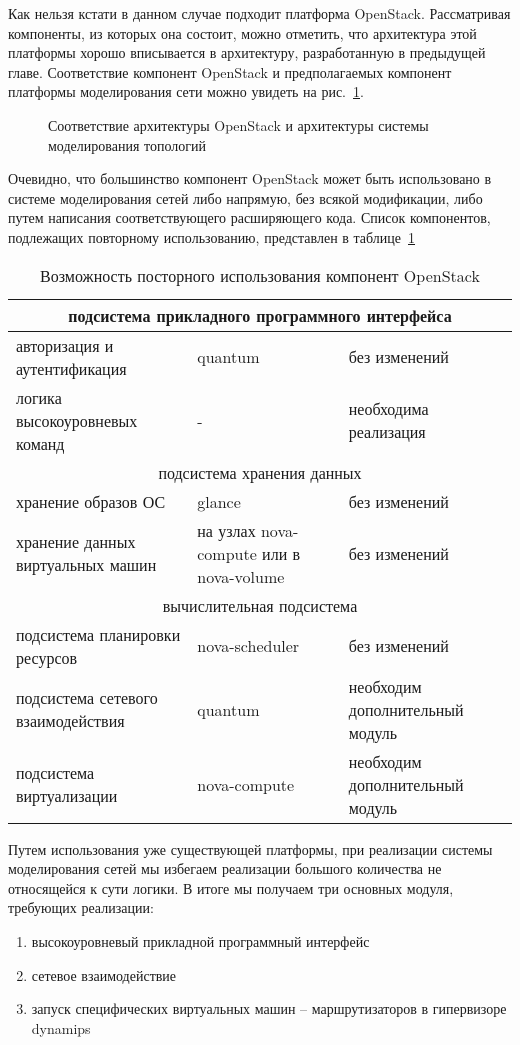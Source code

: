 Как нельзя кстати в данном случае подходит платформа OpenStack. Рассматривая компоненты,
из которых она состоит, можно отметить, что архитектура этой платформы хорошо вписывается
в архитектуру, разработанную в предыдущей главе. Соответствие компонент OpenStack и 
предполагаемых компонент платформы моделирования сети можно увидеть на рис.~\ref{fig:openstack-lowlevel}.
\begin{figure}
  \centering
  {\footnotesize}
  \caption{Соответствие архитектуры OpenStack и архитектуры системы моделирования топологий}  
  \label{fig:openstack-lowlevel}
\end{figure}
Очевидно, что большинство компонент OpenStack может быть использовано в 
системе моделирования сетей либо напрямую, без всякой модификации, либо путем
написания соответствующего расширяющего кода. Список компонентов, подлежащих
повторному использованию, представлен в таблице~\ref{tab:openstack-reuse}
\begin{table}
\center
\caption{Возможность посторного использования компонент OpenStack}
\label{tab:openstack-reuse}
\begin{tabular}{|p{5cm}|p{4cm}|p{5cm}|} \hline 
\multicolumn{3}{|c|}{подсистема прикладного программного интерфейса} \\ \hline 
авторизация и аутентификация & quantum & без изменений\\ \hline
логика высокоуровневых команд & - & необходима реализация \\ \hline
\multicolumn{3}{|c|}{подсистема хранения данных} \\ \hline
хранение образов ОС & glance & без изменений \\ \hline
хранение данных виртуальных машин & на узлах nova-compute или в nova-volume & без изменений\\ \hline
\multicolumn{3}{|c|}{вычислительная подсистема} \\ \hline
подсистема планировки ресурсов & nova-scheduler & без изменений \\ \hline
подсистема сетевого взаимодействия & quantum & необходим дополнительный модуль \\ \hline
подсистема виртуализации & nova-compute & необходим дополнительный модуль \\ \hline
\hline 
\end{tabular} 
\end{table}

Путем использования уже существующей платформы, при реализации системы моделирования
сетей мы избегаем реализации большого количества не относящейся к сути логики. В итоге мы
получаем три основных модуля, требующих реализации:
\begin{enumerate}
    \item высокоуровневый прикладной программный интерфейс
    \item сетевое взаимодействие
    \item запуск специфических виртуальных машин -- маршрутизаторов в гипервизоре dynamips
\end{enumerate}

